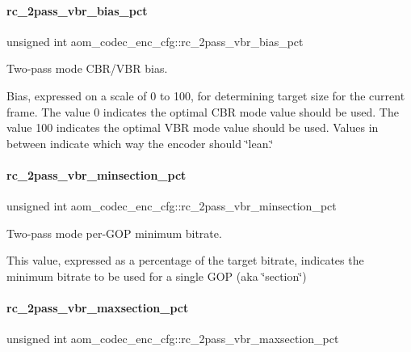 \paragraph{\texorpdfstring{rc\+\_\+2pass\+\_\+vbr\+\_\+bias\+\_\+pct}{rc\_2pass\_vbr\_bias\_pct}}
{\footnotesize\ttfamily unsigned int aom\+\_\+codec\+\_\+enc\+\_\+cfg\+::rc\+\_\+2pass\+\_\+vbr\+\_\+bias\+\_\+pct}



Two-\/pass mode C\+B\+R/\+V\+BR bias. 

Bias, expressed on a scale of 0 to 100, for determining target size for the current frame. The value 0 indicates the optimal C\+BR mode value should be used. The value 100 indicates the optimal V\+BR mode value should be used. Values in between indicate which way the encoder should \char`\"{}lean.\char`\"{} \mbox{\label{structaom__codec__enc__cfg_a623802304a377237ec6df7ae31984655}} 
\paragraph{\texorpdfstring{rc\+\_\+2pass\+\_\+vbr\+\_\+minsection\+\_\+pct}{rc\_2pass\_vbr\_minsection\_pct}}
{\footnotesize\ttfamily unsigned int aom\+\_\+codec\+\_\+enc\+\_\+cfg\+::rc\+\_\+2pass\+\_\+vbr\+\_\+minsection\+\_\+pct}



Two-\/pass mode per-\/\+G\+OP minimum bitrate. 

This value, expressed as a percentage of the target bitrate, indicates the minimum bitrate to be used for a single G\+OP (aka \char`\"{}section\char`\"{}) \mbox{\label{structaom__codec__enc__cfg_a5610caa642c808af885c1521e916a1e6}} 
\paragraph{\texorpdfstring{rc\+\_\+2pass\+\_\+vbr\+\_\+maxsection\+\_\+pct}{rc\_2pass\_vbr\_maxsection\_pct}}
{\footnotesize\ttfamily unsigned int aom\+\_\+codec\+\_\+enc\+\_\+cfg\+::rc\+\_\+2pass\+\_\+vbr\+\_\+maxsection\+\_\+pct}



